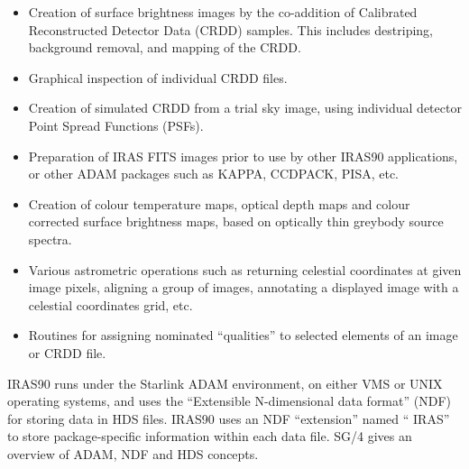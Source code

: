\begin{itemize}

\item Creation of surface brightness images by the co-addition of Calibrated
Reconstructed Detector Data ({\small CRDD}) samples. This includes destriping,
background removal, and mapping of the {\small CRDD}.

\item Graphical inspection of individual {\small CRDD} files.

\item Creation of simulated {\small CRDD} from a trial sky image, using individual
detector Point Spread Functions (PSFs).

\item Preparation of {\small IRAS} {\small FITS} images prior to use by other
{\small IRAS90} applications, or other {\small ADAM} packages such as {\small
KAPPA, CCDPACK, PISA,} etc. 

\item Creation of colour temperature maps, optical depth maps and colour
corrected surface brightness maps, based on optically thin greybody source
spectra. 

\item Various astrometric operations such as returning celestial coordinates
at given image pixels, aligning a group of images, annotating a displayed
image with a celestial coordinates grid, etc.

\item Routines for assigning nominated ``qualities'' to selected elements of an
image or {\small CRDD} file.

\end{itemize}

{\small IRAS90} runs under the Starlink {\small ADAM} environment, on either
{\small VMS} or {\small UNIX} operating systems, and uses the ``Extensible
N-dimensional data format'' ({\small NDF}) for storing data in {\small HDS}
files. {\small IRAS90} uses an {\small NDF} ``extension'' named ``{\small
IRAS}'' to store package-specific information within each data file. SG/4 gives
an overview of {\small ADAM}, {\small NDF} and {\small HDS} concepts. 

